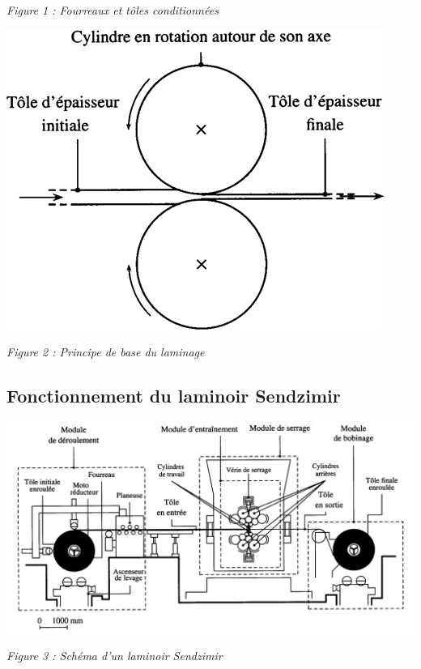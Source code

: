 \documentclass[10pt,fleqn]{article} %
\begin{document}
\begin{multicols}{2}
\begin{minipage}[c]{.48\linewidth}
\begin{center}
\textit{Figure 1 : Fourreaux et tôles conditionnées}
\end{center}
\end{minipage}\hfill
\begin{minipage}[c]{.48\linewidth}
\begin{center}
\includegraphics[width=.95\linewidth]{images/figure_02}

\textit{Figure 2 : Principe de base du laminage}
\end{center}
\end{minipage}\hfill


\subsection*{Fonctionnement du laminoir Sendzimir}

\begin{center}
\includegraphics[width=.95\linewidth]{images/figure_03}

\textit{Figure 3 : Schéma d'un laminoir Sendzimir}
\end{center}


\end{multicols}
\end{document}
